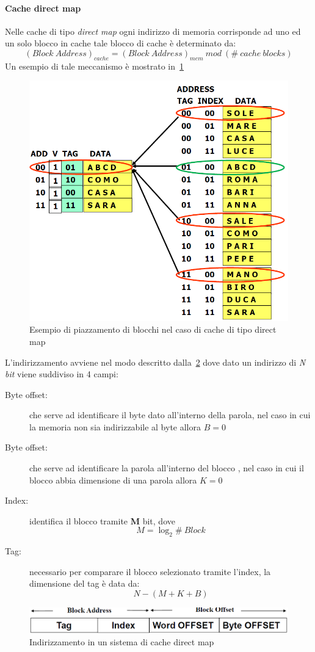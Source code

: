 \paragraph{Cache direct map}
Nelle cache di tipo \emph{direct map} ogni indirizzo di memoria corrisponde ad uno ed un solo blocco in cache tale blocco di cache è determinato da:
$$(Block \ Address)_{cache} = (Block \ Address)_{mem} \ mod \ (\# \ cache \ blocks)$$
Un esempio di tale meccanismo è mostrato in \figurename\,\ref{fig:directmapexe}
\begin{figure}
\centering
\includegraphics[scale=0.5]{img/directmapexe.png}
\caption{Esempio di piazzamento di blocchi nel caso di cache di tipo direct map}\label{fig:directmapexe}
\end{figure}
L'indirizzamento avviene nel modo descritto dalla \figurename\,\ref{fig:directaddressing} dove dato un indirizzo di \emph{N bit} viene suddiviso in 4 campi:
\begin{description}
\item[Byte offset:] che serve ad identificare il byte dato all'interno della parola, nel caso in cui la memoria non sia indirizzabile al byte allora $B = 0$
\item[Byte offset:] che serve ad identificare la parola all'interno del blocco , nel caso in cui il blocco abbia dimensione di una parola allora $K = 0$
\item[Index:] identifica il blocco tramite \textbf{M} bit, dove 
$$M = \log_2 \# \ Block$$
\item[Tag:] necessario per comparare il blocco selezionato tramite l'index, la dimensione del tag è data da:
$$N - (M + K + B)$$
\end{description}
\begin{figure}
\centering 
\includegraphics[scale=0.5]{img/directaddressing.png}
\caption{Indirizzamento in un sistema di cache direct map}\label{fig:directaddressing}
\end{figure}

